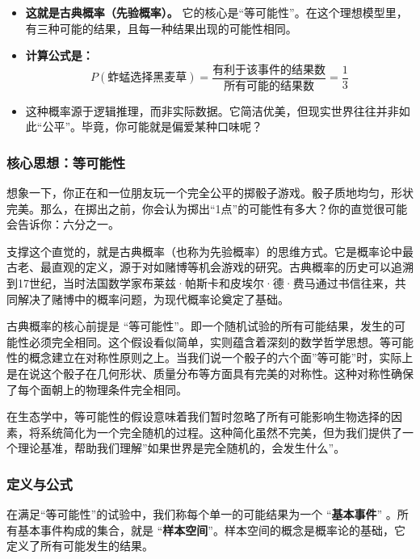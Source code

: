 \documentclass[
]{book}
\providecommand{\tightlist}{%
  \setlength{\itemsep}{0pt}\setlength{\parskip}{0pt}}
\begin{document}
\begin{itemize}
\tightlist
\item
  \textbf{这就是古典概率（先验概率）。} 它的核心是``等可能性''。在这个理想模型里，有三种可能的结果，且每一种结果出现的可能性相同。
\item
  \textbf{计算公式是：} \[P(\text{蚱蜢选择黑麦草}) = \frac{\text{有利于该事件的结果数}}{\text{所有可能的结果数}} = \frac{1}{3}\]
\item
  这种概率源于逻辑推理，而非实际数据。它简洁优美，但现实世界往往并非如此``公平''。毕竟，你可能就是偏爱某种口味呢？
\end{itemize}

\hypertarget{ux6838ux5fc3ux601dux60f3ux7b49ux53efux80fdux6027}{%
\subsubsection{核心思想：等可能性}\label{ux6838ux5fc3ux601dux60f3ux7b49ux53efux80fdux6027}}

想象一下，你正在和一位朋友玩一个完全公平的掷骰子游戏。骰子质地均匀，形状完美。那么，在掷出之前，你会认为掷出``1点''的可能性有多大？你的直觉很可能会告诉你：六分之一。

支撑这个直觉的，就是古典概率（也称为先验概率）的思维方式。它是概率论中最古老、最直观的定义，源于对如赌博等机会游戏的研究。古典概率的历史可以追溯到17世纪，当时法国数学家布莱兹·帕斯卡和皮埃尔·德·费马通过书信往来，共同解决了赌博中的概率问题，为现代概率论奠定了基础。

古典概率的核心前提是 ``等可能性''。即一个随机试验的所有可能结果，发生的可能性必须完全相同。这个假设看似简单，实则蕴含着深刻的数学哲学思想。等可能性的概念建立在对称性原则之上。当我们说一个骰子的六个面''等可能''时，实际上是在说这个骰子在几何形状、质量分布等方面具有完美的对称性。这种对称性确保了每个面朝上的物理条件完全相同。

在生态学中，等可能性的假设意味着我们暂时忽略了所有可能影响生物选择的因素，将系统简化为一个完全随机的过程。这种简化虽然不完美，但为我们提供了一个理论基准，帮助我们理解''如果世界是完全随机的，会发生什么''。

\hypertarget{ux5b9aux4e49ux4e0eux516cux5f0f}{%
\subsubsection{定义与公式}\label{ux5b9aux4e49ux4e0eux516cux5f0f}}

在满足``等可能性''的试验中，我们称每个单一的可能结果为一个 ``\textbf{基本事件}'' 。所有基本事件构成的集合，就是 ``\textbf{样本空间}''。样本空间的概念是概率论的基础，它定义了所有可能发生的结果。
\end{document}
